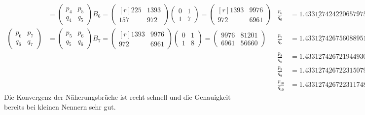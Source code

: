 \begin{loesung}
\begin{align*}
&=
\begin{pmatrix}
p_4&p_5\\
q_4&q_5
\end{pmatrix}
B_6
=
\begin{pmatrix*}[r]
225&1393\\
157& 972
\end{pmatrix*}
\begin{pmatrix}
0&1\\
1&7
\end{pmatrix}
=
\begin{pmatrix*}[r]
1393&9976\\
 972&6961
\end{pmatrix*}
&
\frac{p_6}{q_6}
&=
1.\underline{43312742}4220657975
\\
\begin{pmatrix}
p_6&p_7\\
q_6&q_7
\end{pmatrix}
&=
\begin{pmatrix}
p_5&p_6\\
q_5&q_6
\end{pmatrix}
B_7
=
\begin{pmatrix*}[r]
1393&9976\\
 972&6961
\end{pmatrix*}
\begin{pmatrix}
0&1\\
1&8
\end{pmatrix}
=
\begin{pmatrix}
9976&81201\\
6961&56660
\end{pmatrix}
&
\frac{p_7}{q_7}
&=
1.\underline{4331274267}56088951
\\
&&
\frac{p_8}{q_8}
&=
1.\underline{43312742672}1944930
\\
&&
\frac{p_9}{q_9}
&=
1.\underline{43312742672231}5079
\\
&&
\frac{p_{10}}{q_{10}}
&=
1.\underline{43312742672231}1748
\end{align*}
Die Konvergenz der Näherungsbrüche ist recht schnell und die Genauigkeit
bereits bei kleinen Nennern sehr gut.
\end{loesung}

